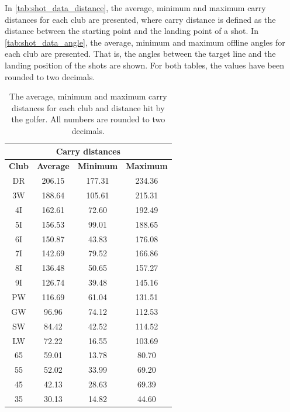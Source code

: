 \documentclass{kththesis}
\begin{document}
In \autoref{tab:shot_data_distance}, the average, minimum and maximum carry distances for each club are presented, where carry distance is defined as the distance between the starting point and the landing point of a shot. In \autoref{tab:shot_data_angle}, the average, minimum and maximum offline angles for each club are presented. That is, the angles between the target line and the landing position of the shots are shown. For both tables, the values have been rounded to two decimals.

\begin{table}
\centering
\begin{tabular}{|c|c|c|c|} \hline
\multicolumn{4}{|c|}{\textbf{Carry distances}} \\ \hline
\textbf{Club} & \textbf{Average} & \textbf{Minimum} & \textbf{Maximum} \\ \hline
DR & 206.15 & 177.31 & 234.36 \\ \hline
3W & 188.64 & 105.61 & 215.31 \\ \hline
4I & 162.61 & 72.60 & 192.49 \\ \hline
5I & 156.53 & 99.01 & 188.65 \\ \hline
6I & 150.87 & 43.83 & 176.08 \\ \hline
7I & 142.69 & 79.52 & 166.86 \\ \hline
8I & 136.48 & 50.65 & 157.27 \\ \hline
9I & 126.74 & 39.48 & 145.16 \\ \hline
PW & 116.69 & 61.04 & 131.51 \\ \hline
GW & 96.96 & 74.12 & 112.53 \\ \hline
SW & 84.42 & 42.52 & 114.52 \\ \hline
LW & 72.22 & 16.55 & 103.69 \\ \hline
65 & 59.01 & 13.78 & 80.70 \\ \hline
55 & 52.02 & 33.99 & 69.20 \\ \hline
45 & 42.13 & 28.63 & 69.39 \\ \hline
35 & 30.13 & 14.82 & 44.60 \\ \hline
\end{tabular}
\caption{The average, minimum and maximum carry distances for each club and distance hit by the golfer. All numbers are rounded to two decimals.}
\label{tab:shot_data_distance}
\end{table}
\end{document}
